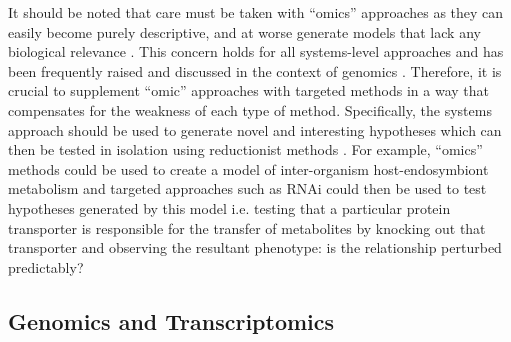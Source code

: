 It should be noted that care must be taken with ``omics'' approaches as they can easily become purely descriptive,
and at worse generate models that lack any biological relevance \citep{Fang2011}.  
This concern holds for all systems-level approaches and has been frequently raised and discussed in the context
of genomics \citep{Dougherty2008}.  Therefore, it is crucial to supplement ``omic'' approaches with targeted
methods in a way that compensates for the weakness of each type of method.
Specifically, the systems approach should be used to generate novel and interesting
hypotheses which can then be tested in isolation using reductionist methods \citep{Casadevall2008}.  
For example, ``omics'' methods could be used to create a model of inter-organism host-endosymbiont
metabolism and targeted approaches such as RNAi could then be used to test hypotheses generated
by this model i.e. testing that a particular protein transporter is responsible
for the transfer of metabolites by knocking out that transporter and observing the resultant phenotype: 
is the relationship perturbed predictably?





\subsection{Genomics and Transcriptomics}

